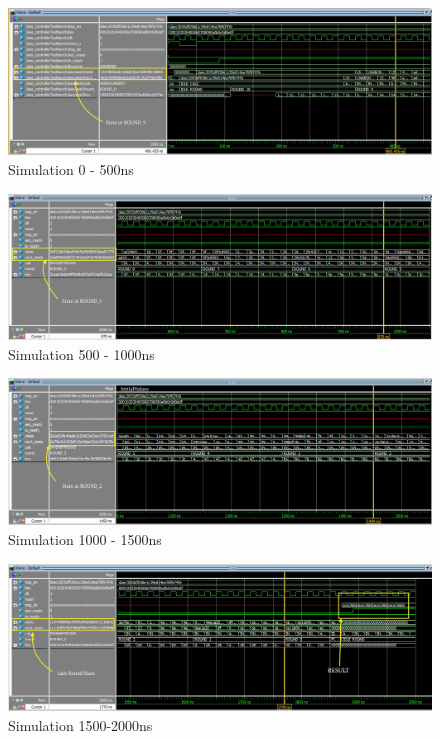 \documentclass[journal, twocolumn, final,11pt,letterpaper]{IEEEtran}
\begin{document}
\begin{figure} [H]
	\centering
	\includegraphics[scale=.35]{simulate-0-500.png}
	\caption{Simulation 0 - 500ns\label{fig:0-500}}
\end{figure}          


\begin{figure} [H]
	\centering
	\includegraphics[scale=.35]{simulate-500-1000.png}
	\caption{Simulation 500 - 1000ns\label{fig:500-1000}}
\end{figure}          


\begin{figure} [H]
	\centering
	\includegraphics[scale=.35]{simulate-1000-1500.png}
	\caption{Simulation 1000 - 1500ns\label{fig:1000-1500}}
\end{figure}          


\begin{figure} [H]
	\centering
	\includegraphics[scale=.35]{simulate-1500-2000.png}
	\caption{Simulation 1500-2000ns\label{fig:1500-2000}}
\end{figure}          
\end{document}

